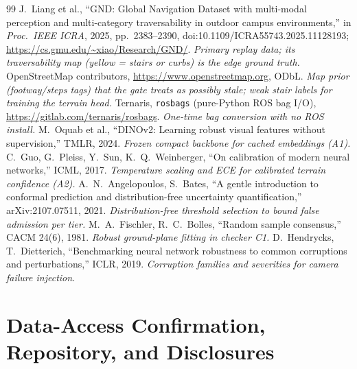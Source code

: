 \documentclass[10pt,letterpaper]{article}
\newcommand{\cl}[1]{\texttt{#1}}
\begin{document}
\renewcommand{\refname}{References (annotated)}
\small
\begin{thebibliography}{99}
\setlength{\itemsep}{1pt}
 J.~Liang et al., ``GND: Global Navigation Dataset with multi-modal perception and
multi-category traversability in outdoor campus environments,'' in \emph{Proc.\ IEEE ICRA}, 2025,
pp.~2383--2390, doi:10.1109/ICRA55743.2025.11128193; \url{https://cs.gmu.edu/~xiao/Research/GND/}.
\emph{Primary replay data; its traversability map (yellow = stairs or curbs) is the edge ground truth.}
 OpenStreetMap contributors, \url{https://www.openstreetmap.org}, ODbL.
\emph{Map prior (footway/steps tags) that the gate treats as possibly stale; weak stair labels for training the terrain head.}
 Ternaris, \cl{rosbags} (pure-Python ROS bag I/O), \url{https://gitlab.com/ternaris/rosbags}.
\emph{One-time bag conversion with no ROS install.}
 M.~Oquab et al., ``DINOv2: Learning robust visual features without supervision,''
TMLR, 2024. \emph{Frozen compact backbone for cached embeddings (A1).}
 C.~Guo, G.~Pleiss, Y.~Sun, K.~Q.~Weinberger, ``On calibration of modern neural
networks,'' ICML, 2017. \emph{Temperature scaling and ECE for calibrated terrain confidence (A2).}
 A.~N.~Angelopoulos, S.~Bates, ``A gentle introduction to conformal prediction and
distribution-free uncertainty quantification,'' arXiv:2107.07511, 2021.
\emph{Distribution-free threshold selection to bound false admission per tier.}
 M.~A.~Fischler, R.~C.~Bolles, ``Random sample consensus,'' CACM 24(6), 1981.
\emph{Robust ground-plane fitting in checker C1.}
 D.~Hendrycks, T.~Dietterich, ``Benchmarking neural network robustness to common
corruptions and perturbations,'' ICLR, 2019. \emph{Corruption families and severities for camera failure injection.}
\end{thebibliography}
\normalsize

\appendix
\section{Data-Access Confirmation, Repository, and Disclosures}
\end{document}
